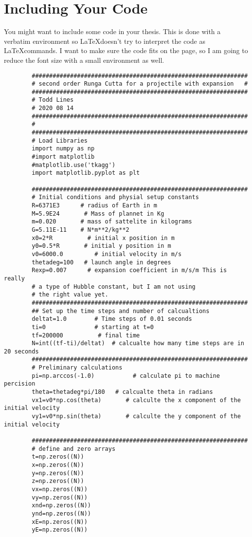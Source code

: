 \chapter{Including Your Code}
\label{app:Talk}

You might want to include some code in your thesis. This is done with a verbatim environment so \LaTeX \enspace doesn't try to interpret the code as \LaTeX \enspace commands. I want to make sure the code fits on the page, so I am going to reduce the font size with a small environment as well. 
\begin{small}
\begingroup
\makeatletter
\@totalleftmargin=-1cm
	\begin{verbatim}
		##############################################################
		# second order Runga Cutta for a projectile with expansion   #
		##############################################################
		# Todd Lines
		# 2020 08 14
		##############################################################
		# 
		##############################################################
		# Load Libraries
		import numpy as np
		#import matplotlib
		#matplotlib.use('tkagg')
		import matplotlib.pyplot as plt
		
		##############################################################
		# Initial conditions and physial setup constants
		R=6371E3      # radius of Earth in m
		M=5.9E24       # Mass of plannet in Kg
		m=0.020       # mass of sattelite in kilograms
		G=5.11E-11    # N*m**2/kg**2
		x0=2*R          # initial x position in m
		y0=0.5*R       # initial y position in m
		v0=6000.0         # initial velocity in m/s
		thetadeg=100   # launch angle in degrees
		Rexp=0.007      # expansion coefficient in m/s/m This is really 
		# a type of Hubble constant, but I am not using
		# the right value yet.
		##############################################################
		## Set up the time steps and number of calcualtions
		deltat=1.0        # Time steps of 0.01 seconds
		ti=0              # starting at t=0
		tf=200000          # final time
		N=int((tf-ti)/deltat)  # calcualte how many time steps are in 20 seconds
		##############################################################
		# Preliminary calculations
		pi=np.arccos(-1.0)           # calculate pi to machine percision
		theta=thetadeg*pi/180   # calcualte theta in radians
		vx1=v0*np.cos(theta)       # calculte the x component of the initial velocity
		vy1=v0*np.sin(theta)       # calculte the y component of the initial velocity
		
		##############################################################
		# define and zero arrays
		t=np.zeros((N))
		x=np.zeros((N))
		y=np.zeros((N))
		z=np.zeros((N))
		vx=np.zeros((N))
		vy=np.zeros((N))
		xnd=np.zeros((N))
		ynd=np.zeros((N))
		xE=np.zeros((N))
		yE=np.zeros((N))
		

\end{verbatim}
\end{small}
